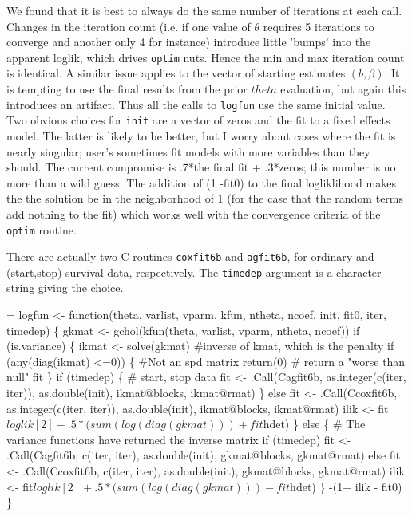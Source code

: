 \documentclass{article}
\newcommand{\code}[1]{\texttt{#1}}
\begin{document}
We found that it is best to always do the same number of iterations at
each call.  Changes in the iteration count (i.e. if one value of
$\theta$ requires 5 iterations to converge and another only 4 for instance) 
introduce little 'bumps' into the apparent loglik, which
drives \Verb!optim! nuts. Hence the min and max iteration count is identical.
A similar issue applies to the vector of starting estimates $(b, \beta)$.
It is tempting to use the final results from the prior $theta$ evaluation,
but again this introduces an artifact.
Thus all the calls to \Verb!logfun! use the same initial value.
Two obvious choices for \Verb!init! are a vector of zeros and the fit
to a fixed effects model.  The latter is likely to be better,
but I worry about cases where the fit is nearly
singular; user's sometimes fit models with more variables than they should. %
The current compromise is .7*the final fit + .3*zeros; this number is no
more than a wild guess.
The addition of (1 -fit0) to the final logliklihood makes the 
the solution be in the neighborhood of 1 (for the case that the random
terms add nothing to the fit)
which works well with the convergence criteria of
the \Verb!optim! routine.

There are actually two C routines \Verb!coxfit6b! and \Verb?agfit6b?, for ordinary
and (start,stop) survival data, respectively.  The \code{timedep} argument 
is a character string giving the choice.
\begin{nwchunk}
=
 logfun <- function(theta, varlist, vparm, kfun, ntheta, ncoef, 
                    init, fit0, iter, timedep) \{
     gkmat <- gchol(kfun(theta, varlist, vparm, ntheta, ncoef))
     if (is.variance) \{
         ikmat <- solve(gkmat)  #inverse of kmat, which is the penalty
         if (any(diag(ikmat) <=0)) \{ #Not an spd matrix
             return(0)  # return a "worse than null" fit
         \}
         if (timedep) \{
             # start, stop data
             fit <- .Call(Cagfit6b, as.integer(c(iter, iter)), 
                          as.double(init), ikmat@blocks, ikmat@rmat)
             \}
         else fit <- .Call(Ccoxfit6b, as.integer(c(iter, iter)), 
                          as.double(init), ikmat@blocks, ikmat@rmat) 
         ilik <- fit$loglik[2] -
             .5*(sum(log(diag(gkmat))) + fit$hdet)
     \}
     else \{
         # The variance functions have returned the inverse matrix
         if (timedep) fit <- .Call(Cagfit6b, c(iter, iter), as.double(init),
                                   gkmat@blocks, gkmat@rmat)
         else fit <- .Call(Ccoxfit6b, c(iter, iter), as.double(init),
                           gkmat@blocks, gkmat@rmat)
         ilik <- fit$loglik[2] + .5*(sum(log(diag(gkmat))) - fit$hdet)
     \}
     -(1+ ilik - fit0)
     \}
\end{nwchunk}
\end{document}

